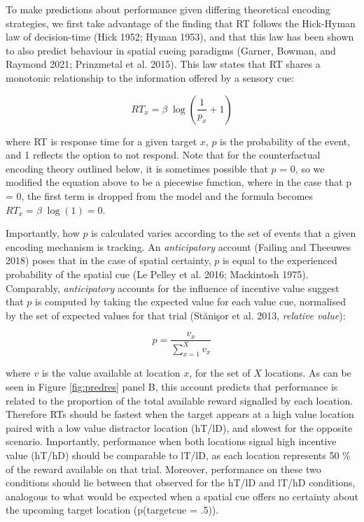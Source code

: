 \documentclass[11pt,halfline,a4paper,]{ouparticle}
\begin{document}
To make predictions about performance given differing theoretical encoding strategies, we first take advantage of the finding that RT follows the Hick-Hyman law of decision-time (Hick 1952; Hyman 1953), and that this law has been shown to also predict behaviour in spatial cueing paradigms (Garner, Bowman, and Raymond 2021; Prinzmetal et al. 2015). This law states that RT shares a monotonic relationship to the information offered by a sensory cue:

\begin{equation}\label{eq:HH}
  RT_x = \beta \; \log(\frac{1}{p_x} + 1)
\end{equation}

where RT is response time for a given target \(x\), \(p\) is the probability of the event, and 1 reflects the option to not respond. Note that for the counterfactual encoding theory outlined below, it is sometimes possible that \(p\) = 0, so we modified the equation above to be a piecewise function, where in the case that p = 0, the first term is dropped from the model and the formula becomes \(RT_x = \beta \; \log(1) = 0\).

Importantly, how \(p\) is calculated varies according to the set of events that a given encoding mechanism is tracking. An \emph{anticipatory} account (Failing and Theeuwes 2018) poses that in the case of spatial certainty, \(p\) is equal to the experienced probability of the spatial cue (Le Pelley et al. 2016; Mackintosh 1975). Comparably, \emph{anticipatory} accounts for the influence of incentive value suggest that \(p\) is computed by taking the expected value for each value cue, normalised by the set of expected values for that trial (Stănişor et al. 2013, \emph{relative value}):

\begin{equation}\label{eq:relVal}
  p = \frac{v_x}{\sum_{x=1}^{X} v_x}
\end{equation}

where \(v\) is the value available at location \(x\), for the set of \(X\) locations. As can be seen in Figure \ref{fig:predres} panel B, this account predicts that performance is related to the proportion of the total available reward signalled by each location. Therefore RTs should be fastest when the target appears at a high value location paired with a low value distractor location (hT/lD), and slowest for the opposite scenario. Importantly, performance when both locations signal high incentive value (hT/hD) should be comparable to lT/lD, as each location represents 50 \% of the reward available on that trial. Moreover, performance on these two conditions should lie between that observed for the hT/lD and lT/hD conditions, analogous to what would be expected when a spatial cue offers no certainty about the upcoming target location (p(target\textbar cue = .5)).
\end{document}
